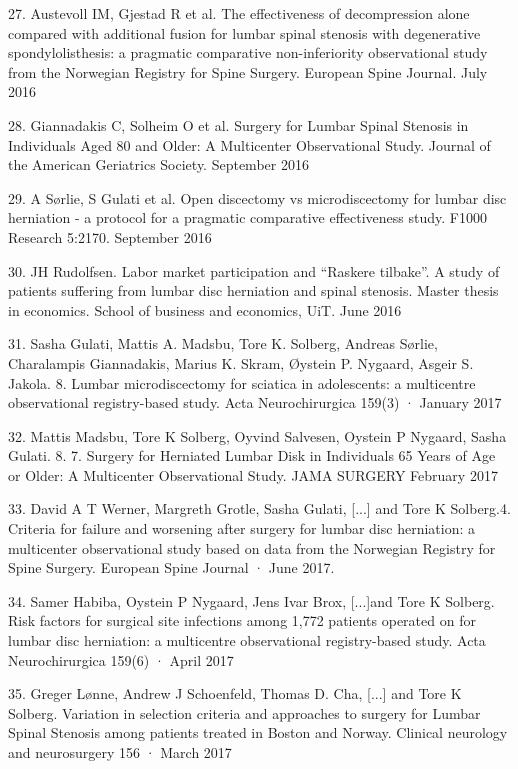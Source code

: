 \documentclass[norsk, a4paper, twocolumn]{report}
\begin{document}
27.	Austevoll IM, Gjestad R et al. The effectiveness of decompression alone compared with additional fusion for lumbar spinal stenosis with degenerative spondylolisthesis: a pragmatic comparative non-inferiority observational study from the Norwegian Registry for Spine Surgery. European Spine Journal. July 2016

28.	Giannadakis C, Solheim O et al. Surgery for Lumbar Spinal Stenosis in Individuals Aged 80 and Older: A Multicenter Observational Study. Journal of the American Geriatrics Society. September 2016

29.	A Sørlie, S Gulati et al. Open discectomy vs microdiscectomy for lumbar disc herniation - a protocol for a pragmatic comparative effectiveness study. F1000 Research 5:2170. September 2016

30.	JH Rudolfsen. Labor market participation and “Raskere tilbake”. A study of patients suffering from lumbar disc herniation and spinal stenosis. Master thesis in economics. School of business and economics, UiT. June 2016


31. Sasha Gulati, Mattis A. Madsbu, Tore K. Solberg, Andreas Sørlie, Charalampis Giannadakis, Marius K. Skram, Øystein P. Nygaard, Asgeir S. Jakola. 8.	Lumbar microdiscectomy for sciatica in adolescents: a multicentre observational registry-based study. Acta Neurochirurgica 159(3) · January 2017

32. Mattis Madsbu, Tore K Solberg, Oyvind Salvesen, Oystein P Nygaard, Sasha Gulati. 8.	7.	Surgery for Herniated Lumbar Disk in Individuals 65 Years of Age or Older: A Multicenter Observational Study. JAMA SURGERY  February 2017

33. David A T Werner, Margreth Grotle, Sasha Gulati, [...] and Tore K Solberg.4. Criteria for failure and worsening after surgery for lumbar disc herniation: a multicenter observational study based on data from the Norwegian Registry for Spine Surgery. European Spine Journal · June 2017.

34. Samer Habiba, Oystein P Nygaard, Jens Ivar Brox, [...]and Tore K Solberg. Risk factors for surgical site infections among 1,772 patients operated on for lumbar disc herniation: a multicentre observational registry-based study. Acta Neurochirurgica 159(6) · April 2017

35. Greger Lønne, Andrew J Schoenfeld, Thomas D. Cha, [...] and Tore K Solberg. Variation in selection criteria and approaches to surgery for Lumbar Spinal Stenosis among patients treated in Boston and Norway. Clinical neurology and neurosurgery 156 · March 2017  
\end{document}
